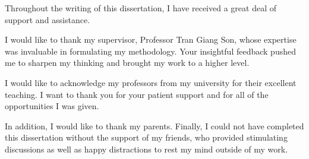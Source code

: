 Throughout the writing of this dissertation, I have received a great deal of support and assistance.

I would like to thank my supervisor, Professor Tran Giang Son, whose expertise was invaluable in formulating my methodology. Your insightful feedback pushed me to sharpen my thinking and brought my work to a higher level.

I would like to acknowledge my professors from my university for their excellent teaching. I want to thank you for your patient support and for all of the opportunities I was given.

In addition, I would like to thank my parents. Finally, I could not have completed this dissertation without the support of my friends, who provided stimulating discussions as well as happy distractions to rest my mind outside of my work.

\thispagestyle{empty} 
